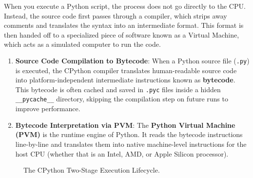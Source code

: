 When you execute a Python script, the process does not go directly to the CPU. Instead, the source code first passes through a compiler, which strips away comments and translates the syntax into an intermediate format. This format is then handed off to a specialized piece of software known as a Virtual Machine, which acts as a simulated computer to run the code.

\begin{enumerate}[leftmargin=1.5em]
    \item \textbf{Source Code Compilation to Bytecode}: When a Python source file (\texttt{.py}) is executed, the CPython compiler translates human-readable source code into platform-independent intermediate instructions known as \textbf{bytecode}. This bytecode is often cached and saved in \texttt{.pyc} files inside a hidden \texttt{\_\_pycache\_\_} directory, skipping the compilation step on future runs to improve performance.
    \item \textbf{Bytecode Interpretation via PVM}: The \textbf{Python Virtual Machine (PVM)} is the runtime engine of Python. It reads the bytecode instructions line-by-line and translates them into native machine-level instructions for the host CPU (whether that is an Intel, AMD, or Apple Silicon processor).
\end{enumerate}

\begin{figure}[htbp]
\centering
{}
\caption{The CPython Two-Stage Execution Lifecycle.}
\label{fig:python-runtime}
\end{figure}


